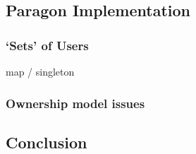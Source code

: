 \subsection{Paragon Implementation}

\subsubsection{`Sets' of Users}

map / singleton

\subsubsection{Ownership model issues}

\subsection{Conclusion}
